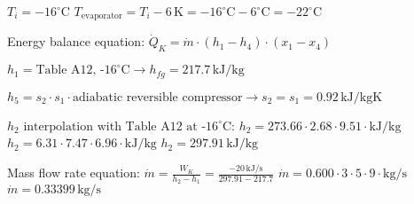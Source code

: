 \( T_i = -16^\circ \text{C} \)  
\( T_{\text{evaporator}} = T_i - 6 \, \text{K} = -16^\circ \text{C} - 6^\circ \text{C} = -22^\circ \text{C} \)  

Energy balance equation:  
\( \dot{Q}_K = \dot{m} \cdot (h_1 - h_4) \cdot (x_1 - x_4) \)  

\( h_1 = \text{Table A12, -16}^\circ \text{C} \rightarrow h_{fg} = 217.7 \, \text{kJ/kg} \)  

\( h_5 = s_2 \cdot s_1 \cdot \text{adiabatic reversible compressor} \rightarrow s_2 = s_1 = 0.92 \, \text{kJ/kgK} \)  

\( h_2 \text{ interpolation with Table A12 at -16}^\circ \text{C} \):  
\( h_2 = 273.66 \cdot 2.68 \cdot 9.51 \cdot \text{kJ/kg} \)  
\( h_2 = 6.31 \cdot 7.47 \cdot 6.96 \cdot \text{kJ/kg} \)  
\( h_2 = 297.91 \, \text{kJ/kg} \)  

Mass flow rate equation:  
\( \dot{m} = \frac{W_K}{h_2 - h_1} = \frac{-20 \, \text{kJ/s}}{297.91 - 217.7} \)  
\( \dot{m} = 0.600 \cdot 3 \cdot 5 \cdot 9 \cdot \text{kg/s} \)  
\( \dot{m} = 0.33399 \, \text{kg/s} \)